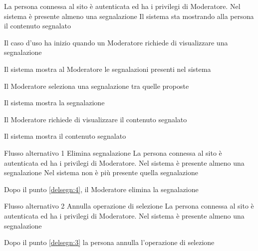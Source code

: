 
{}
{La persona connessa al sito è autenticata  ed ha i privilegi di Moderatore. Nel sistema è presente almeno una segnalazione}
{Il sistema sta mostrando alla persona il \gls{contenuto} segnalato}
{\begin{enumCU}
	\item Il caso d'uso ha inizio quando un Moderatore richiede di visualizzare una segnalazione
	\item Il sistema mostra al Moderatore le segnalazioni presenti nel sistema\label{delsegn:3}
	\item Il Moderatore seleziona una segnalazione tra quelle proposte
	\item Il sistema mostra la segnalazione \label{delsegn:4}
	\item Il Moderatore richiede di visualizzare il \gls{contenuto} segnalato
	\item Il sistema mostra il \gls{contenuto} segnalato
\end{enumCU}
}
%
{Flusso alternativo 1}%
{Elimina segnalazione}%
{La persona connessa al sito è autenticata  ed ha i privilegi di Moderatore. Nel sistema è presente almeno una segnalazione}
{Nel sistema non è più presente quella segnalazione}%
{\begin{enumCU}
		\item Dopo il punto \ref{delsegn:4}, il Moderatore elimina la segnalazione
\end{enumCU}}%
%	
{Flusso alternativo 2}%
{Annulla operazione di selezione}%
{La persona connessa al sito è autenticata ed ha i privilegi di Moderatore. Nel sistema è presente almeno una segnalazione}%
{\postNulle}%
{\begin{enumCU}
		\item Dopo il punto \ref{delsegn:3} la persona annulla l'operazione di selezione
\end{enumCU}}%


